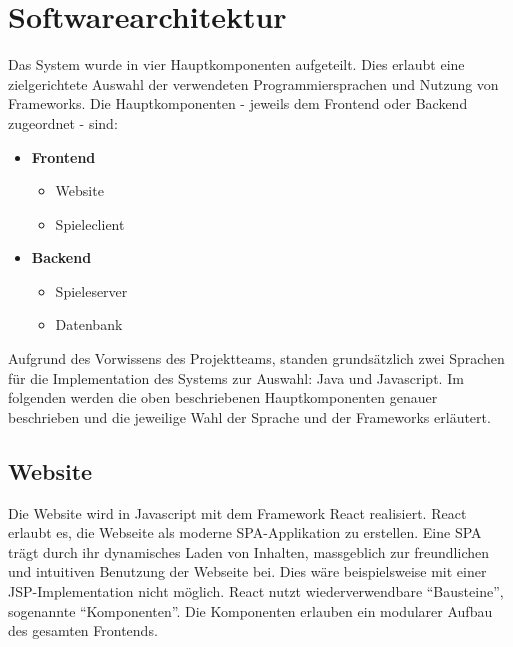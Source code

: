 \documentclass[11pt,ngerman]{article}
\newcommand{\quotes}[1]{``#1''}
\begin{document}
    \section{Softwarearchitektur}
        Das System wurde in vier Hauptkomponenten aufgeteilt. Dies erlaubt eine zielgerichtete Auswahl der verwendeten Programmiersprachen und Nutzung von Frameworks. Die Hauptkomponenten - jeweils dem Frontend oder Backend zugeordnet - sind:
        \begin{multicols}{2}
            \begin{itemize}
                \item \textbf{Frontend}
                \begin{itemize}
                    \item Website
                    \item Spieleclient
                \end{itemize}
                \item \textbf{Backend}
                \begin{itemize}
                    \item Spieleserver
                    \item Datenbank
                \end{itemize}
            \end{itemize}
        \end{multicols}

        \noindent Aufgrund des Vorwissens des Projektteams, standen grundsätzlich zwei Sprachen für die Implementation des Systems zur Auswahl: Java und Javascript. Im folgenden werden die oben beschriebenen Hauptkomponenten genauer beschrieben und die jeweilige Wahl der Sprache und der Frameworks erläutert.

        \subsection{Website}
        Die Website wird in Javascript mit dem Framework \Gls{React} realisiert. \Gls{React} erlaubt es, die Webseite als moderne \Gls{SPA}-Applikation zu erstellen. Eine \Gls{SPA} trägt durch ihr dynamisches Laden von Inhalten, massgeblich zur freundlichen und intuitiven Benutzung der Webseite bei. Dies wäre beispielsweise mit einer \Gls{JSP}-Implementation nicht möglich. \Gls{React} nutzt wiederverwendbare  \quotes{Bausteine}, sogenannte \quotes{Komponenten}. Die Komponenten erlauben ein modularer Aufbau des gesamten Frontends.
\end{document}
